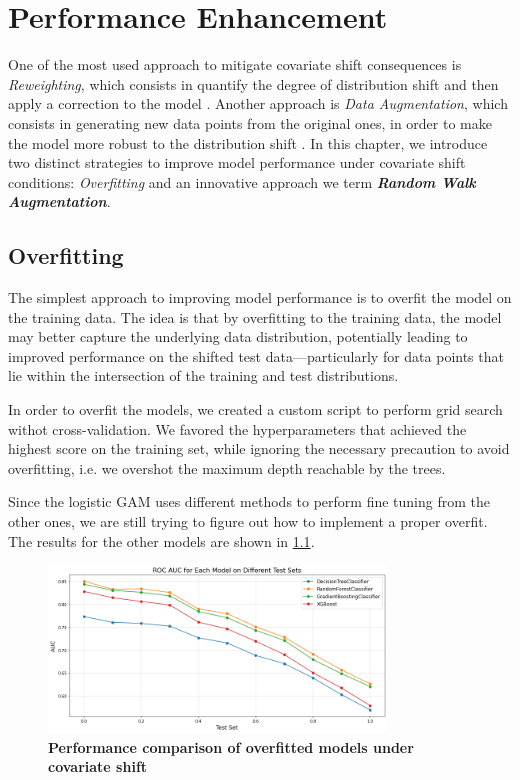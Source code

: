 \chapter{Performance Enhancement}

One of the most used approach to mitigate covariate shift consequences is \textit{Reweighting}, which consists in quantify the degree of distribution shift and then apply a correction to the model \cite{zhang}. Another approach is \textit{Data Augmentation}, which consists in generating new data points from the original ones, in order to make the model more robust to the distribution shift \cite{zhao}. In this chapter, we introduce two distinct strategies to improve model performance under covariate shift conditions: \textit{Overfitting} and an innovative approach we term \textbf{\textit{Random Walk Augmentation}}.

\section{Overfitting}

The simplest approach to improving model performance is to overfit the model on the training data. The idea is that by overfitting to the training data, the model may better capture the underlying data distribution, potentially leading to improved performance on the shifted test data—particularly for data points that lie within the intersection of the training and test distributions.

In order to overfit the models, we created a custom script to perform grid search withot cross-validation. We favored the hyperparameters that achieved the highest score on the training set, while ignoring the necessary precaution to avoid overfitting, i.e. we overshot the maximum depth reachable by the trees.

Since the logistic GAM uses different methods to perform fine tuning from the other ones, we are still trying to figure out how to implement a proper overfit. The results for the other models are shown in \cref{fig:overfitted-models-perf}.

\begin{figure}[H]
    \centering
    \includegraphics[width=0.8\textwidth]{assets/overfit_no_gam.png} 
    \caption{\textbf{Performance comparison of overfitted models under covariate shift}}
    \label{fig:overfitted-models-perf}
\end{figure}


